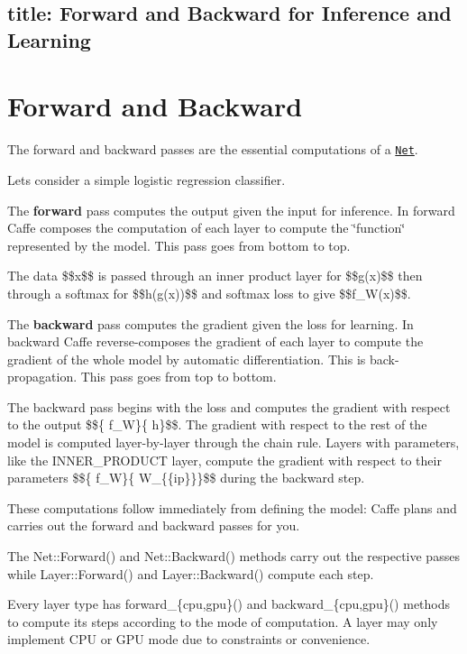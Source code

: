 

 \subsection*{title\+: Forward and Backward for Inference and Learning }

\section*{Forward and Backward}

The forward and backward passes are the essential computations of a \href{net_layer_blob.html}{\tt Net}.



Let\textquotesingle{}s consider a simple logistic regression classifier.

The {\bfseries forward} pass computes the output given the input for inference. In forward Caffe composes the computation of each layer to compute the \char`\"{}function\char`\"{} represented by the model. This pass goes from bottom to top.



The data \$\$x\$\$ is passed through an inner product layer for \$\$g(x)\$\$ then through a softmax for \$\$h(g(x))\$\$ and softmax loss to give \$\$f\+\_\+\+W(x)\$\$.

The {\bfseries backward} pass computes the gradient given the loss for learning. In backward Caffe reverse-\/composes the gradient of each layer to compute the gradient of the whole model by automatic differentiation. This is back-\/propagation. This pass goes from top to bottom.



The backward pass begins with the loss and computes the gradient with respect to the output \$\$\{ f\+\_\+W\}\{ h\}\$\$. The gradient with respect to the rest of the model is computed layer-\/by-\/layer through the chain rule. Layers with parameters, like the {\ttfamily I\+N\+N\+E\+R\+\_\+\+P\+R\+O\+D\+U\+CT} layer, compute the gradient with respect to their parameters \$\$\{ f\+\_\+W\}\{ W\+\_\+\{\{ip\}\}\}\$\$ during the backward step.

These computations follow immediately from defining the model\+: Caffe plans and carries out the forward and backward passes for you.


\begin{DoxyItemize}
\item The {\ttfamily Net\+::\+Forward()} and {\ttfamily Net\+::\+Backward()} methods carry out the respective passes while {\ttfamily Layer\+::\+Forward()} and {\ttfamily Layer\+::\+Backward()} compute each step.
\item Every layer type has {\ttfamily forward\+\_\+\{cpu,gpu\}()} and {\ttfamily backward\+\_\+\{cpu,gpu\}()} methods to compute its steps according to the mode of computation. A layer may only implement C\+PU or G\+PU mode due to constraints or convenience.
\end{DoxyItemize}

